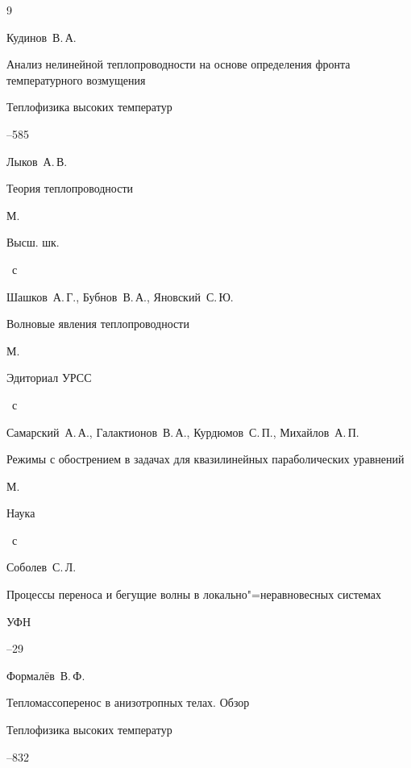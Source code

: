 \begin{thebibliography}{9}


\by Кудинов~В.\,А.

\paper Анализ нелинейной теплопроводности на основе определения фронта температурного возмущения 

\jour Теплофизика высоких температур




--585




\by Лыков~А.\,В.

\book Теория теплопроводности 

\publaddr М.

\publ Высш. шк.


~с




\by Шашков~А.\,Г., Бубнов~В.\,А., Яновский~С.\,Ю.

\book Волновые явления теплопроводности 

\publaddr М.

\publ Эдиториал УРСС


~с




\by Самарский~А.\,А.,  Галактионов~В.\,А., Курдюмов~С.\,П., Михайлов~А.\,П.

\book Режимы с обо\-с\-т\-рением в задачах для квазилинейных параболических уравнений 

\publaddr М.

\publ Наука


~с




\by Соболев~С.\,Л.

\paper Процессы переноса и бегущие волны в локально"=неравновесных системах 

\jour УФН




--29




\by Формалёв~В.\,Ф.

\paper Тепломассоперенос в анизотропных телах. Обзор

\jour Теплофизика высоких температур




--832



\end{thebibliography}
